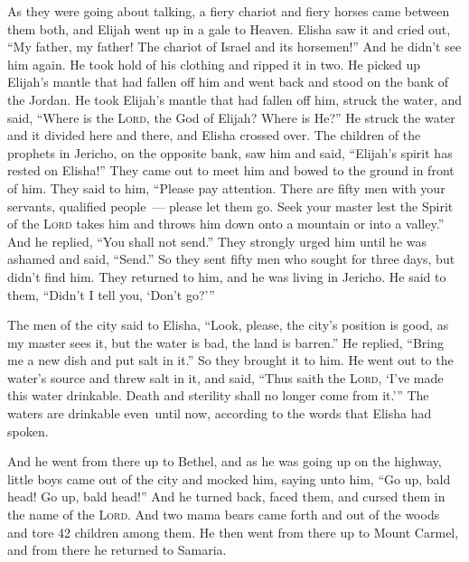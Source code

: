 \begin{inparaenum}
     As they were going about talking, a fiery chariot and fiery horses came between them both, and Elijah went up in a gale to Heaven.%
     Elisha saw it and cried out, ``My father, my father! The chariot of Israel and its horsemen!'' And he didn't see him again. He took hold of his clothing and ripped it in two.%
     He picked up Elijah's mantle that had fallen off him and went back and stood on the bank of the Jordan.%
     He took Elijah's mantle that had fallen off him, struck the water, and said, ``Where is the \textsc{Lord}, the God of Elijah? Where is He?'' He struck the water and it divided here and there, and Elisha crossed over.%
     The children of the prophets in Jericho, on the opposite bank, saw him and said, ``Elijah's spirit has rested on Elisha!'' They came out to meet him and bowed to the ground in front of him.%
     They said to him, ``Please pay attention. There are fifty men with your servants, qualified people~--- please let them go. Seek your master lest the Spirit of the \textsc{Lord} takes him and throws him down onto a mountain or into a valley.'' And he replied, ``You shall not send.''%
     They strongly urged him until he was ashamed and said, ``Send.'' So they sent fifty men who sought for three days, but didn't find him.%
     They returned to him, and he was living in Jericho. He said to them, ``Didn't I tell you, `Don't go?'\thinspace''%
    
     The men of the city said to Elisha, ``Look, please, the city's position is good, as my master sees it, but the water is bad, the land is barren.''%
     He replied, ``Bring me a new dish and put salt in it.'' So they brought it to him.%
     He went out to the water's source and threw salt in it, and said, ``Thus saith the \textsc{Lord}, `I've made this water drinkable. Death and sterility shall no longer come from it.'\thinspace''%
     The waters are drinkable even\understood\ until now, according to the words that Elisha had spoken.%
    
     And he went from there up to Bethel, and as he was going up on the highway, little boys came out of the city and mocked him, saying unto him, ``Go up, bald head! Go up, bald head!''%
     And he turned back, faced them, and cursed them in the name of the \textsc{Lord}. And two mama bears came forth and out of the woods and tore 42 children among them.%
     He then went from there up to Mount Carmel, and from there he returned to Samaria.%
\end{inparaenum}
